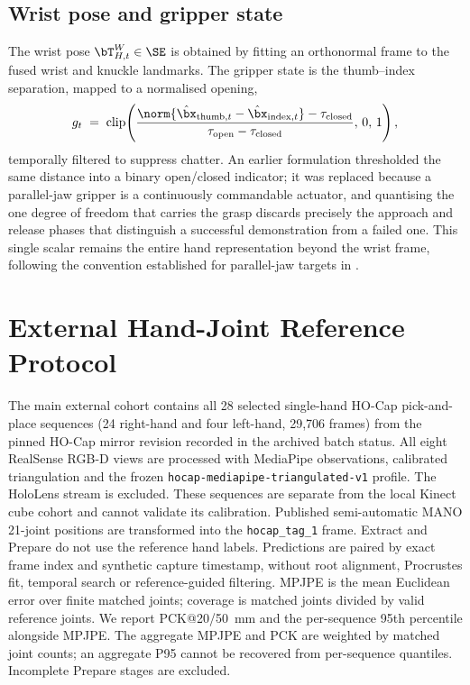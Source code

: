 \subsection{Wrist pose and gripper state}

The wrist pose $\bT^{W}_{H,t} \in \SE$ is obtained by fitting an orthonormal
frame to the fused wrist and knuckle landmarks. The gripper state is the thumb--index
separation, mapped to a normalised opening,
\begin{equation}
  g_t \;=\;
  \operatorname{clip}\!\left(
    \frac{\norm{\hat{\bx}_{\text{thumb},t} - \hat{\bx}_{\text{index},t}}
          - \tau_{\text{closed}}}
         {\tau_{\text{open}} - \tau_{\text{closed}}},\,0,\,1\right),
  \label{eq:gripper}
\end{equation}
temporally filtered to suppress chatter. An earlier formulation thresholded the
same distance into a binary open/closed indicator; it was replaced because a
parallel-jaw gripper is a continuously commandable actuator, and quantising the
one degree of freedom that carries the grasp discards precisely the approach
and release phases that distinguish a successful demonstration from a failed
one. This single scalar remains the entire hand representation beyond the wrist
frame, following the convention established for parallel-jaw targets in
\cite{opentv, ace}.

\section{External Hand-Joint Reference Protocol}
\label{sec:hocap-method}

The main external cohort contains all 28 selected single-hand HO-Cap
pick-and-place sequences (24 right-hand and four left-hand, 29,706 frames)
from the pinned HO-Cap mirror revision recorded in the archived batch
status. All eight RealSense RGB-D views are processed with MediaPipe observations,
calibrated triangulation and the frozen \texttt{hocap-mediapipe-triangulated-v1}
profile. The HoloLens stream is excluded. These sequences are separate from
the local Kinect cube cohort and cannot validate its calibration. Published
semi-automatic MANO 21-joint positions are transformed into the
\texttt{hocap\_tag\_1} frame. Extract and Prepare do not use the reference
hand labels. Predictions are paired by exact frame index and synthetic
capture timestamp, without root alignment, Procrustes fit, temporal search
or reference-guided filtering. MPJPE is the mean Euclidean error over finite
matched joints; coverage is matched joints divided by valid reference joints.
We report PCK@20/50~mm and the per-sequence 95th percentile alongside MPJPE.
The aggregate MPJPE and PCK are weighted by matched joint counts; an
aggregate P95 cannot be recovered from per-sequence quantiles. Incomplete
Prepare stages are excluded.

